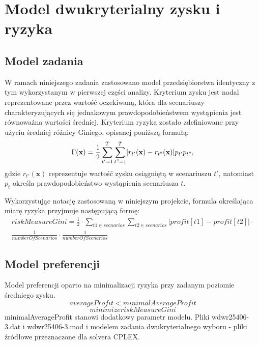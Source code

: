 \section{Model dwukryterialny zysku i ryzyka}

\subsection{Model zadania}
W ramach niniejszego zadania zastosowano model przedsiębiorstwa identyczny z tym wykorzystanym w pierwszej części analizy. 
Kryterium zysku jest nadal reprezentowane przez wartość oczekiwaną, która dla scenariuszy charakteryzujących się jednakowym 
prawdopodobieństwem wystąpienia jest równoważna wartości średniej. Kryterium ryzyka zostało zdefiniowane przy użyciu średniej 
różnicy Giniego, opisanej poniższą formułą:
\begin{equation}
\Gamma(\mathbf{x})=\frac{1}{2}\sum_{t'=1}^{T}\sum_{t"=1}^{T}\lvert r_{t'}(\mathbf{x})-r_{t"}(\mathbf{x})\rvert p_{t'}p_{t"}, 
\end{equation}
gdzie $r_{t'}(\mathbf{x})$ reprezentuje wartość zysku osiągniętą w scenariuszu $t'$, natomiast $p_{t}$ określa prawdopodobieństwo wystąpienia scenariusza $t$.

Wykorzystując notację zastosowaną w niniejszym projekcie, formula określająca miarę ryzyka przyjmuje następującą formę:
\begin{multline}
riskMeasureGini = \frac{1}{2}\cdot\sum_{t1 \in scenarios}\sum_{t2 \in scenarios} \lvert profit[t1]-profit[t2] \rvert \cdot \\ \frac{1}{numberOfScenarios} \cdot \frac{1}{numberOfScenarios} 
\end{multline}

\subsection{Model preferencji}
Model preferencji oparto na minimalizacji ryzyka przy zadanym poziomie średniego zysku.
\begin{equation}
averageProfit<minimalAverageProfit
\end{equation}
\begin{equation}
minimize riskMeasureGini
\end{equation}
minimalAverageProfit stanowi dodatkowy parametr modelu. Pliki wdwr25406-3.dat i wdwr25406-3.mod i modelem zadania dwukryterialnego wyboru - 
pliki źródłowe przeznaczone dla solvera CPLEX. 

